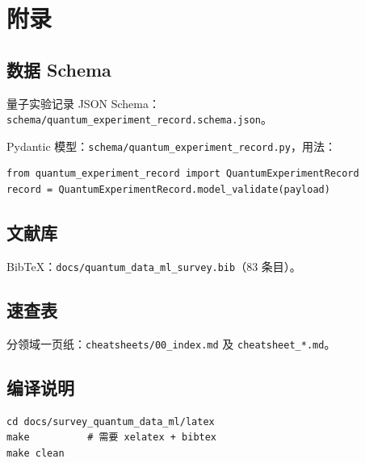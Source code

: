 \section{附录}
\label{sec:appendix}

\subsection{数据 Schema}
\label{sec:appendix-schema}

量子实验记录 JSON Schema：\texttt{schema/quantum\_experiment\_record.schema.json}。

Pydantic 模型：\texttt{schema/quantum\_experiment\_record.py}，用法：
\begin{verbatim}
from quantum_experiment_record import QuantumExperimentRecord
record = QuantumExperimentRecord.model_validate(payload)
\end{verbatim}

\subsection{文献库}

BibTeX：\texttt{docs/quantum\_data\_ml\_survey.bib}（83 条目）。

\subsection{速查表}

分领域一页纸：\texttt{cheatsheets/00\_index.md} 及 \texttt{cheatsheet\_*.md}。

\subsection{编译说明}

\begin{verbatim}
cd docs/survey_quantum_data_ml/latex
make          # 需要 xelatex + bibtex
make clean
\end{verbatim}
